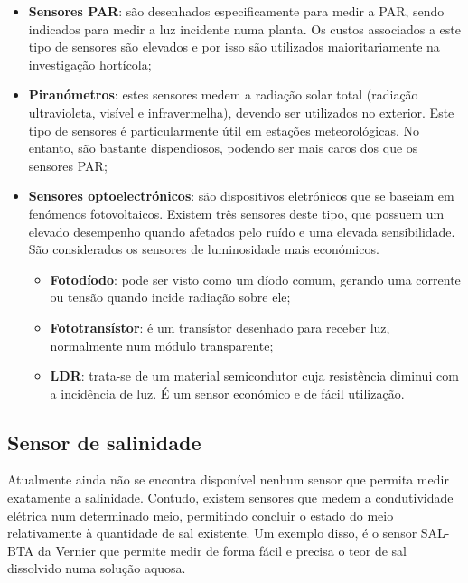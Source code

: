 \begin{itemize}
	\item \textbf{Sensores \ac{PAR}}: são desenhados especificamente para medir a \ac{PAR}, sendo indicados para medir a luz incidente numa planta. Os custos associados a este tipo de sensores são elevados e por isso são utilizados maioritariamente na investigação hortícola; 
	


	
	
	
	\item \textbf{Piranómetros}: estes sensores medem a radiação solar total (radiação ultravioleta, visível e infravermelha), devendo ser utilizados no exterior. Este tipo de sensores é particularmente útil em estações meteorológicas. No entanto, são bastante dispendiosos, podendo ser mais caros dos que os sensores \ac{PAR}; 
	
	
	
	
	\item \textbf{Sensores optoelectrónicos}: são dispositivos eletrónicos que se baseiam em fenómenos fotovoltaicos. Existem três sensores deste tipo, que possuem um elevado desempenho quando afetados pelo ruído e uma elevada sensibilidade. São considerados os sensores de luminosidade mais económicos.  
	 
		\begin{itemize}
			\item \textbf{Fotodíodo}: pode ser visto como um díodo comum, gerando uma corrente ou tensão quando incide radiação sobre ele; 
			\item \textbf{Fototransístor}: é um transístor desenhado para receber luz, normalmente num módulo transparente; 
			\item \textbf{\ac{LDR}}: trata-se de um material semicondutor cuja resistência diminui com a incidência de luz. É um sensor económico e de fácil utilização. 
		\end{itemize}
	
\end{itemize}





\subsection{Sensor de salinidade}


Atualmente ainda não se encontra disponível nenhum sensor que permita medir exatamente a salinidade. Contudo, existem sensores que medem a condutividade elétrica num determinado meio, permitindo concluir o estado do meio relativamente à quantidade de sal existente. 
Um exemplo disso, é o sensor SAL-BTA da Vernier\cite{sall} que permite medir de forma fácil e precisa o teor de sal dissolvido numa solução aquosa.




